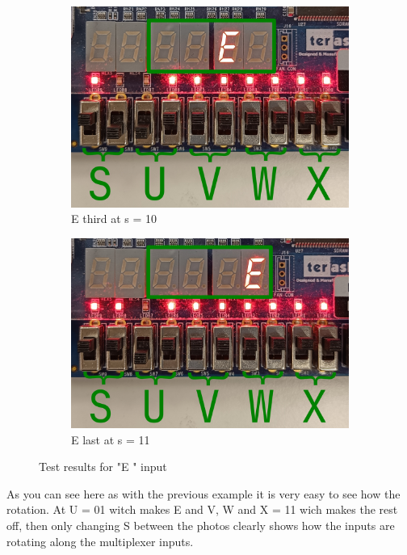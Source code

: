 \documentclass{article}
\begin{document}
\begin{figure}[h]
\begin{subfigure}{0.45\textwidth}
        \includegraphics[width=1\textwidth]{Figures/Part5_E_10.png}
        \caption{E third at s = 10}
        \label{fig:T05epic3}
    \end{subfigure}
    \hfill
    \begin{subfigure}{0.45\textwidth}
        \centering
        \includegraphics[width=1\textwidth]{Figures/Part5_E_11.png}
        \caption{E last at s = 11}
        \label{fig:T05epic4}
    \end{subfigure}
    \caption{Test results for "E   " input}
    \label{fig:T05epic}
\end{figure}
As you can see here as with the previous example it is very easy to see how the rotation. At U = 01 witch makes E and V, W and X = 11 wich makes the rest off, then only changing S between the photos clearly shows how the inputs are rotating along the multiplexer inputs.
\end{document}
